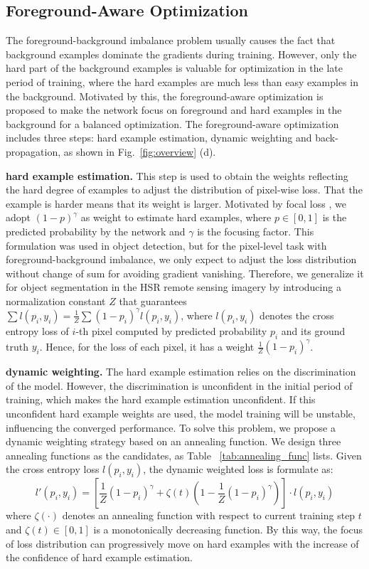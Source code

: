 \documentclass[10pt,twocolumn,letterpaper]{article}
\begin{document}
\subsection{Foreground-Aware Optimization}
The foreground-background imbalance problem usually causes the fact that background examples dominate the gradients during training.
However, only the hard part of the background examples is valuable for optimization in the late period of training, where the hard examples are much less than easy examples in the background.
Motivated by this, the foreground-aware optimization is proposed to make the network focus on foreground and hard examples in the background for a balanced optimization.
The foreground-aware optimization includes three steps: hard example estimation, dynamic weighting and back-propagation, as shown in Fig.~\ref{fig:overview} (d).


\textbf{hard example estimation.}
This step is used to obtain the weights reflecting the hard degree of examples to adjust the distribution of pixel-wise loss.
That the example is harder means that its weight is larger.
Motivated by focal loss \cite{lin2017focal}, we adopt $(1 - p)^{\gamma}$ as weight to estimate hard examples, where $p \in [0, 1]$ is the predicted probability by the network and $\gamma$ is the focusing factor.
This formulation was used in object detection, but for the pixel-level task with foreground-background imbalance, we only expect to adjust the loss distribution without change of sum for avoiding gradient vanishing.
Therefore, we generalize it for object segmentation in the HSR remote sensing imagery by introducing a normalization constant $Z$ that guarantees $\sum{l(p_i, y_i)} = \frac{1}{Z}\sum{(1-p_i)^\gamma l(p_i, y_i)}$, where $l(p_i, y_i)$ denotes the cross entropy loss of $i$-th pixel computed by predicted probability $p_i$ and its ground truth $y_i$.
Hence, for the loss of each pixel, it has a weight $\frac{1}{Z}(1-p_i)^\gamma$.


\textbf{dynamic weighting.}
The hard example estimation relies on the discrimination of the model.
However, the discrimination is unconfident in the initial period of training, which makes the hard example estimation unconfident.
If this unconfident hard example weights are used, the model training will be unstable, influencing the converged performance.
To solve this problem, we propose a dynamic weighting strategy based on an annealing function.
We design three annealing functions as the candidates, as Table ~\ref{tab:annealing_func} lists.
Given the cross entropy loss $l(p_i, y_i)$, the dynamic weighted loss is formulate as:
\begin{equation}
   l'(p_i, y_i) = [\frac{1}{Z}(1 - p_i)^{\gamma} + \zeta(t)(1 - \frac{1}{Z}(1 - p_i)^{\gamma})]\cdot l(p_i, y_i)
\end{equation}
where $\zeta(\cdot)$ denotes an annealing function with respect to current training step $t$ and $\zeta(t) \in [0, 1]$ is a monotonically decreasing function.
By this way, the focus of loss distribution can progressively move on hard examples with the increase of the confidence of hard example estimation.
\end{document}
